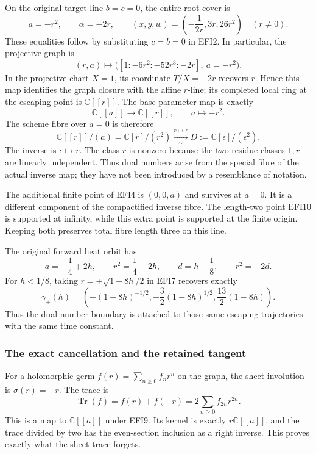 \documentclass[
  10pt,
  a4paper,
]{article}
\begin{document}
On the original target line \(b=c=0\), the entire root cover is \[
a=-r^2,\qquad \alpha=-2r,
\qquad (x,y,w)=\left(-\frac1{2r},3r,26r^2\right)\quad(r\ne0).
\tag{EFI7}
\] These equalities follow by substituting \(c=b=0\) in EFI2. In
particular, the projective graph is \[
(r,a)\longmapsto
\bigl([1:-6r^2:-52r^3:-2r],\ a=-r^2\bigr).
\tag{EFI8}
\] In the projective chart \(X=1\), its coordinate \(T/X=-2r\) recovers
\(r\). Hence this map identifies the graph closure with the affine
\(r\)-line; its completed local ring at the escaping point is
\(\mathbb C[[r]]\). The base parameter map is exactly \[
\mathbb C[[a]]\longrightarrow\mathbb C[[r]],\qquad a\longmapsto-r^2.
\tag{EFI9}
\] The scheme fibre over \(a=0\) is therefore \[
\mathbb C[[r]]/(a)=\mathbb C[r]/(r^2)
\xrightarrow[\sim]{r\mapsto\epsilon}
D:=\mathbb C[\epsilon]/(\epsilon^2).
\tag{EFI10}
\] The inverse is \(\epsilon\mapsto r\). The class \(r\) is nonzero
because the two residue classes \(1,r\) are linearly independent. Thus
dual numbers arise from the special fibre of the actual inverse map;
they have not been introduced by a resemblance of notation.

The additional finite point of EFI4 is \((0,0,a)\) and survives at
\(a=0\). It is a different component of the compactified inverse fibre.
The length-two point EFI10 is supported at infinity, while this extra
point is supported at the finite origin. Keeping both preserves total
fibre length three on this line.

The original forward heat orbit has \[
a=-\frac14+2h,\qquad r^2=\frac14-2h,
\qquad d=h-\frac18,\qquad r^2=-2d.
\tag{EFI11}
\] For \(h<1/8\), taking \(r=\mp\sqrt{1-8h}/2\) in EFI7 recovers exactly
\[
\gamma_\pm(h)=
\left(\pm(1-8h)^{-1/2},
\mp\frac32(1-8h)^{1/2},\frac{13}2(1-8h)\right).
\tag{EFI12}
\] Thus the dual-number boundary is attached to those same escaping
trajectories with the same time constant.

\subsubsection{The exact cancellation and the retained
tangent}\label{the-exact-cancellation-and-the-retained-tangent}

For a holomorphic germ \(f(r)=\sum_{n\ge0}f_nr^n\) on the graph, the
sheet involution is \(\sigma(r)=-r\). The trace is \[
\operatorname{Tr}(f)=f(r)+f(-r)=2\sum_{n\ge0}f_{2n}r^{2n}.
\tag{EFI13}
\] This is a map to \(\mathbb C[[a]]\) under EFI9. Its kernel is exactly
\(r\mathbb C[[a]]\), and the trace divided by two has the even-section
inclusion as a right inverse. This proves exactly what the sheet trace
forgets.
\end{document}
